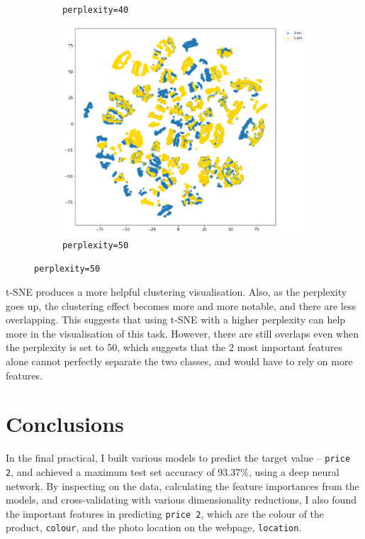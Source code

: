 \documentclass[12pt,twoside,a4paper]{article}
\begin{document}
\begin{figure}
\begin{subfigure}[b]{0.49\linewidth}
        \caption{\texttt{perplexity=40}}
    \end{subfigure}
    \begin{subfigure}[b]{0.49\linewidth}
        \centering
        \includegraphics[width=\linewidth]{images/tsne-50.png}
        \caption{\texttt{perplexity=50}}
    \end{subfigure}
\end{figure}

\newpage
t-SNE produces a more helpful clustering visualisation. Also, as the perplexity goes up, the clustering effect becomes more and more notable, and there are less overlapping. This suggests that using t-SNE with a higher perplexity can help more in the visualisation of this task. However, there are still overlaps even when the perplexity is set to 50, which suggests that the 2 most important features alone cannot perfectly separate the two classes, and would have to rely on more features.

\section{Conclusions}

In the final practical, I built various models to predict the target value -- \texttt{price 2}, and achieved a maximum test set accuracy of 93.37\%, using a deep neural network. By inspecting on the data, calculating the feature importances from the models, and cross-validating with various dimensionality reductions, I also found the important features in predicting \texttt{price 2}, which are the colour of the product, \texttt{colour}, and the photo location on the webpage, \texttt{location}.



\end{document}
